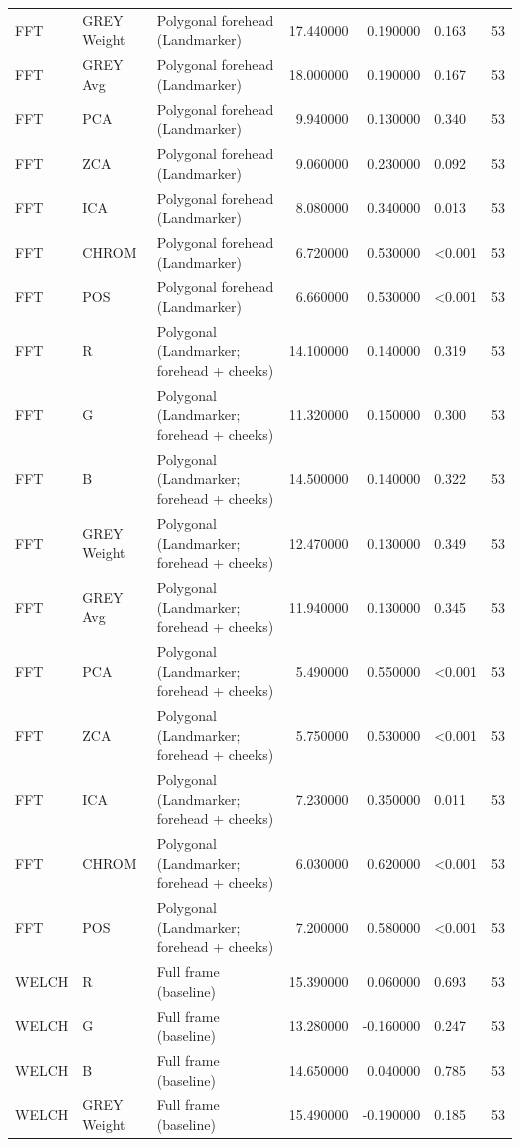 \begin{table}[htbp]
\begin{tabular}{l l l r r l r}
FFT & GREY Weight & Polygonal forehead (Landmarker) & 17.440000 & 0.190000 & 0.163 & 53 \\
FFT & GREY Avg & Polygonal forehead (Landmarker) & 18.000000 & 0.190000 & 0.167 & 53 \\
FFT & PCA & Polygonal forehead (Landmarker) & 9.940000 & 0.130000 & 0.340 & 53 \\
FFT & ZCA & Polygonal forehead (Landmarker) & 9.060000 & 0.230000 & 0.092 & 53 \\
FFT & ICA & Polygonal forehead (Landmarker) & 8.080000 & 0.340000 & 0.013 & 53 \\
FFT & CHROM & Polygonal forehead (Landmarker) & 6.720000 & 0.530000 & <0.001 & 53 \\
FFT & POS & Polygonal forehead (Landmarker) & 6.660000 & 0.530000 & <0.001 & 53 \\
FFT & R & Polygonal (Landmarker; forehead + cheeks) & 14.100000 & 0.140000 & 0.319 & 53 \\
FFT & G & Polygonal (Landmarker; forehead + cheeks) & 11.320000 & 0.150000 & 0.300 & 53 \\
FFT & B & Polygonal (Landmarker; forehead + cheeks) & 14.500000 & 0.140000 & 0.322 & 53 \\
FFT & GREY Weight & Polygonal (Landmarker; forehead + cheeks) & 12.470000 & 0.130000 & 0.349 & 53 \\
FFT & GREY Avg & Polygonal (Landmarker; forehead + cheeks) & 11.940000 & 0.130000 & 0.345 & 53 \\
FFT & PCA & Polygonal (Landmarker; forehead + cheeks) & 5.490000 & 0.550000 & <0.001 & 53 \\
FFT & ZCA & Polygonal (Landmarker; forehead + cheeks) & 5.750000 & 0.530000 & <0.001 & 53 \\
FFT & ICA & Polygonal (Landmarker; forehead + cheeks) & 7.230000 & 0.350000 & 0.011 & 53 \\
FFT & CHROM & Polygonal (Landmarker; forehead + cheeks) & 6.030000 & 0.620000 & <0.001 & 53 \\
FFT & POS & Polygonal (Landmarker; forehead + cheeks) & 7.200000 & 0.580000 & <0.001 & 53 \\
WELCH & R & Full frame (baseline) & 15.390000 & 0.060000 & 0.693 & 53 \\
WELCH & G & Full frame (baseline) & 13.280000 & -0.160000 & 0.247 & 53 \\
WELCH & B & Full frame (baseline) & 14.650000 & 0.040000 & 0.785 & 53 \\
WELCH & GREY Weight & Full frame (baseline) & 15.490000 & -0.190000 & 0.185 & 53 \\

\end{tabular}
\end{table}
